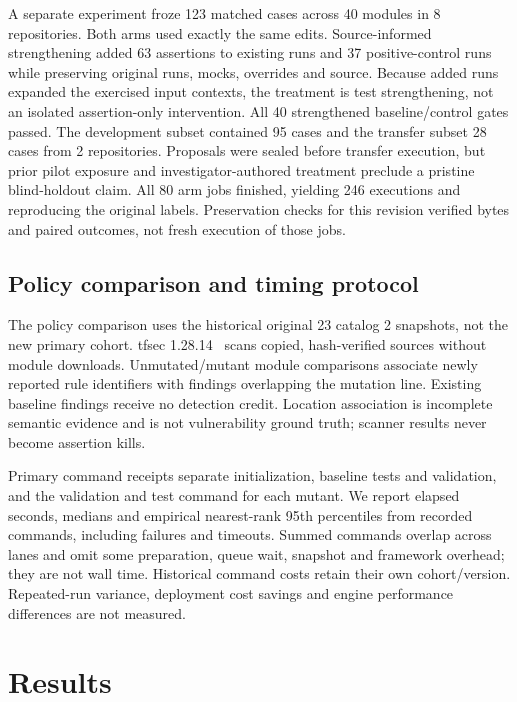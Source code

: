 A separate experiment froze 123 matched cases across 40 modules in 8 repositories. Both arms used exactly the same edits. Source-informed strengthening added 63 assertions to existing runs and 37 positive-control runs while preserving original runs, mocks, overrides and source. Because added runs expanded the exercised input contexts, the treatment is test strengthening, not an isolated assertion-only intervention. All 40 strengthened baseline/control gates passed. The development subset contained 95 cases and the transfer subset 28 cases from 2 repositories. Proposals were sealed before transfer execution, but prior pilot exposure and investigator-authored treatment preclude a pristine blind-holdout claim. All 80 arm jobs finished, yielding 246 executions and reproducing the original labels. Preservation checks for this revision verified bytes and paired outcomes, not fresh execution of those jobs.

\subsection{Policy comparison and timing protocol}\label{sec:protocol}
The policy comparison uses the historical original 23 catalog 2 snapshots, not the new primary cohort. tfsec 1.28.14~\cite{tfsec} scans copied, hash-verified sources without module downloads. Unmutated/mutant module comparisons associate newly reported rule identifiers with findings overlapping the mutation line. Existing baseline findings receive no detection credit. Location association is incomplete semantic evidence and is not vulnerability ground truth; scanner results never become assertion kills.

Primary command receipts separate initialization, baseline tests and validation, and the validation and test command for each mutant. We report elapsed seconds, medians and empirical nearest-rank 95th percentiles from recorded commands, including failures and timeouts. Summed commands overlap across lanes and omit some preparation, queue wait, snapshot and framework overhead; they are not wall time. Historical command costs retain their own cohort/version. Repeated-run variance, deployment cost savings and engine performance differences are not measured.

\section{Results}\label{sec:results}

